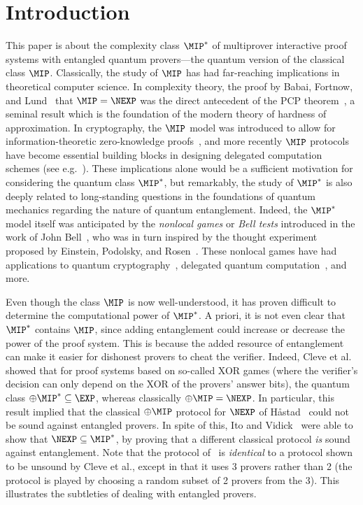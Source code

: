 \section{Introduction}  \label{sec:intro}

This paper is about the complexity class $\MIP^*$ of multiprover interactive proof systems with
entangled quantum provers---the quantum version of the classical class
$\MIP$. Classically, the study of $\MIP$ has had far-reaching
implications in theoretical computer science. In complexity theory, the proof by
Babai, Fortnow, and Lund~\cite{BFL91} that $\MIP = \NEXP$ was the
direct antecedent of the PCP theorem~\cite{ALM+98,AS98}, a seminal
result which is the foundation of the modern theory of hardness of approximation. In cryptography, the $\MIP$ model was introduced
to allow for information-theoretic zero-knowledge proofs~\cite{BGKW88}, and more recently $\MIP$ protocols have become essential building blocks
in designing delegated computation schemes (see e.g.~\cite{KRR14}). These implications alone
would be a sufficient motivation for considering the quantum class
$\MIP^*$, but remarkably, the study of $\MIP^*$ is also deeply related to
long-standing questions in the foundations of quantum
mechanics regarding the nature of quantum entanglement. Indeed, the
$\MIP^*$ model itself was anticipated by the \emph{nonlocal games} or
\emph{Bell tests} introduced in the
work of John Bell~\cite{Bel64}, who was in turn inspired by the thought
experiment proposed by Einstein, Podolsky, and Rosen~\cite{EPR35}.
These nonlocal games have had applications to quantum
cryptography~\cite{Eke91, MY98, Col06}, delegated quantum
computation~\cite{RUV13}, and more.

Even though the class $\MIP$ is now well-understood, it has proven difficult to
determine the computational power of $\MIP^*$. A priori, it is not
even clear that  $\MIP^*$ contains $\MIP$, since adding entanglement could increase or decrease the power of
the proof system. This is because the added resource of entanglement
can make it easier for dishonest provers to cheat the verifier. Indeed, Cleve et al.~\cite{CHTW04} showed that for proof systems
based on so-called XOR games (where the verifier's decision can only
depend on the XOR of the provers' answer bits), the quantum class
$\oplus\MIP^* \subseteq \EXP$, whereas classically $\oplus\MIP =
\NEXP$. In particular, this result implied that the classical
$\oplus\MIP$ protocol for $\NEXP$ of H{\aa}stad~\cite{Has97} could not be sound against entangled
provers.
In spite of this, Ito and Vidick~\cite{IV12,Vid16} were able to show that $\NEXP \subseteq
\MIP^*$, by proving that a different classical protocol \emph{is}
sound against entanglement. Note that the protocol of~\cite{Vid16} is
\emph{identical} to a protocol shown to be unsound by Cleve et al.,
except in that it uses 3 provers rather than 2 (the protocol is played
by choosing a random subset of 2 provers from the 3). This illustrates
the subtleties of dealing with entangled provers.

